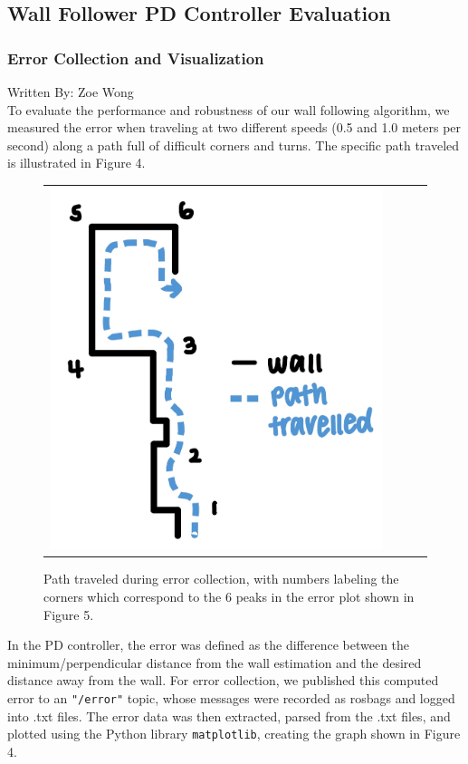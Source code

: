 \documentclass{article}
\begin{document}
\subsection{Wall Follower PD Controller Evaluation}

\subsubsection{Error Collection and Visualization}
Written By: Zoe Wong\\

To evaluate the performance and robustness of our wall following algorithm, we measured the error when traveling at two different speeds (0.5 and 1.0 meters per second) along a path full of difficult corners and turns. The specific path traveled is illustrated in Figure 4. \\

\begin{figure}[h]
\begin{center}
\begin{tabular}{c c c c}

\includegraphics[width=.4\textwidth]{imgs/error_path_labeled.jpg} %
\end{tabular}
\caption{Path traveled during error collection, with numbers labeling the corners which correspond to the 6 peaks in the error plot shown in Figure 5.}
\end{center}
\end{figure}

In the PD controller, the error was defined as the difference between the minimum/perpendicular distance from the wall estimation and the desired distance away from the wall. For error collection, we published this computed error to an \texttt{"/error"} topic, whose messages were recorded as rosbags and logged into .txt files. The error data was then extracted, parsed from the .txt files, and plotted using the Python library \texttt{matplotlib}, creating the graph shown in Figure 4. \\
\end{document}
